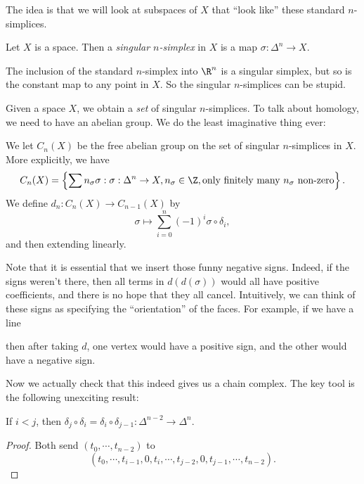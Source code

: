 \documentclass[a4paper]{article}
\begin{document}
The idea is that we will look at subspaces of $X$ that ``look like'' these standard $n$-simplices.
\begin{defi}
  Let $X$ is a space. Then a \emph{singular $n$-simplex} in $X$ is a map $\sigma: \Delta^n \to X$.
\end{defi}

\begin{eg}
  The inclusion of the standard $n$-simplex into $\R^n$ is a singular simplex, but so is the constant map to any point in $X$. So the singular $n$-simplices can be stupid.
\end{eg}

Given a space $X$, we obtain a \emph{set} of singular $n$-simplices. To talk about homology, we need to have an abelian group. We do the least imaginative thing ever:

\begin{defi}
  We let $C_n(X)$ be the free abelian group on the set of singular $n$-simplices in $X$. More explicitly, we have
  \[
    C_n(X) = \left\{\sum n_\sigma \sigma: \sigma: \Delta^n \to X, n_\sigma \in \Z, \text{only finitely many $n_\sigma$ non-zero}\right\}.
  \]
  We define $d_n: C_n(X) \to C_{n - 1}(X)$ by
  \[
    \sigma \mapsto \sum_{i = 0}^n (-1)^i \sigma \circ \delta_i,
  \]
  and then extending linearly.
\end{defi}
Note that it is essential that we insert those funny negative signs. Indeed, if the signs weren't there, then all terms in $d(d(\sigma))$ would all have positive coefficients, and there is no hope that they all cancel. Intuitively, we can think of these signs as specifying the ``orientation'' of the faces. For example, if we have a line
\begin{center}
\end{center}
then after taking $d$, one vertex would have a positive sign, and the other would have a negative sign.

Now we actually check that this indeed gives us a chain complex. The key tool is the following unexciting result:
\begin{lemma}
  If $i < j$, then $\delta_j \circ \delta_i = \delta_i \circ \delta_{j - 1} : \Delta^{n - 2} \to \Delta^n$.
\end{lemma}

\begin{proof}
  Both send $(t_0, \cdots, t_{n - 2})$ to
  \[
    (t_0, \cdots, t_{i - 1}, 0, t_i, \cdots, t_{j - 2}, 0, t_{j - 1}, \cdots, t_{n - 2}).
  \]
\end{proof}
\end{document}

